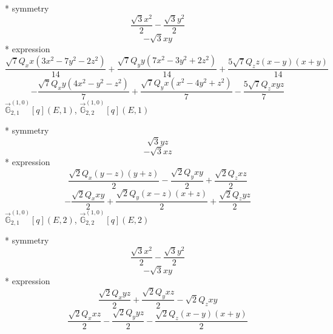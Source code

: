 \documentclass[fleqn,8pt]{jsarticle}
\begin{document}
\noindent\quad ** symmetry
\begin{dmath*}
\frac{\sqrt{3} x^{2}}{2} - \frac{\sqrt{3} y^{2}}{2}
\end{dmath*}
\begin{dmath*}
- \sqrt{3} x y
\end{dmath*}
\noindent\quad ** expression
\begin{dmath*}
\frac{\sqrt{7} Q_{x} x \left(3 x^{2} - 7 y^{2} - 2 z^{2}\right)}{14} + \frac{\sqrt{7} Q_{y} y \left(7 x^{2} - 3 y^{2} + 2 z^{2}\right)}{14} + \frac{5 \sqrt{7} Q_{z} z \left(x - y\right) \left(x + y\right)}{14}
\end{dmath*}
\begin{dmath*}
- \frac{\sqrt{7} Q_{x} y \left(4 x^{2} - y^{2} - z^{2}\right)}{7} + \frac{\sqrt{7} Q_{y} x \left(x^{2} - 4 y^{2} + z^{2}\right)}{7} - \frac{5 \sqrt{7} Q_{z} x y z}{7}
\end{dmath*}
\noindent\quad $\vec{\mathbb{G}}_{2,1}^{(1,0)}[q](E,1)$, $\vec{\mathbb{G}}_{2,2}^{(1,0)}[q](E,1)$

\noindent\quad ** symmetry
\begin{dmath*}
\sqrt{3} y z
\end{dmath*}
\begin{dmath*}
- \sqrt{3} x z
\end{dmath*}
\noindent\quad ** expression
\begin{dmath*}
\frac{\sqrt{2} Q_{x} \left(y - z\right) \left(y + z\right)}{2} - \frac{\sqrt{2} Q_{y} x y}{2} + \frac{\sqrt{2} Q_{z} x z}{2}
\end{dmath*}
\begin{dmath*}
- \frac{\sqrt{2} Q_{x} x y}{2} + \frac{\sqrt{2} Q_{y} \left(x - z\right) \left(x + z\right)}{2} + \frac{\sqrt{2} Q_{z} y z}{2}
\end{dmath*}
\noindent\quad $\vec{\mathbb{G}}_{2,1}^{(1,0)}[q](E,2)$, $\vec{\mathbb{G}}_{2,2}^{(1,0)}[q](E,2)$

\noindent\quad ** symmetry
\begin{dmath*}
\frac{\sqrt{3} x^{2}}{2} - \frac{\sqrt{3} y^{2}}{2}
\end{dmath*}
\begin{dmath*}
- \sqrt{3} x y
\end{dmath*}
\noindent\quad ** expression
\begin{dmath*}
\frac{\sqrt{2} Q_{x} y z}{2} + \frac{\sqrt{2} Q_{y} x z}{2} - \sqrt{2} Q_{z} x y
\end{dmath*}
\begin{dmath*}
\frac{\sqrt{2} Q_{x} x z}{2} - \frac{\sqrt{2} Q_{y} y z}{2} - \frac{\sqrt{2} Q_{z} \left(x - y\right) \left(x + y\right)}{2}
\end{dmath*}
\end{document}
